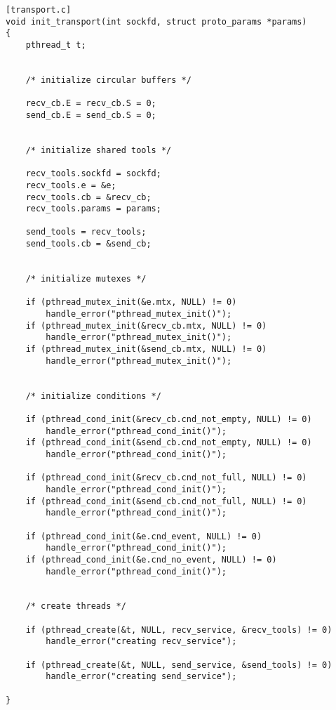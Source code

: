 \begin{lstlisting}[transport.c]
void init_transport(int sockfd, struct proto_params *params)
{
    pthread_t t;


    /* initialize circular buffers */

    recv_cb.E = recv_cb.S = 0;
    send_cb.E = send_cb.S = 0;


    /* initialize shared tools */

    recv_tools.sockfd = sockfd;
    recv_tools.e = &e;
    recv_tools.cb = &recv_cb;
    recv_tools.params = params;

    send_tools = recv_tools;
    send_tools.cb = &send_cb;


    /* initialize mutexes */

    if (pthread_mutex_init(&e.mtx, NULL) != 0)
        handle_error("pthread_mutex_init()");
    if (pthread_mutex_init(&recv_cb.mtx, NULL) != 0)
        handle_error("pthread_mutex_init()");
    if (pthread_mutex_init(&send_cb.mtx, NULL) != 0)
        handle_error("pthread_mutex_init()");


    /* initialize conditions */

    if (pthread_cond_init(&recv_cb.cnd_not_empty, NULL) != 0)
        handle_error("pthread_cond_init()");
    if (pthread_cond_init(&send_cb.cnd_not_empty, NULL) != 0)
        handle_error("pthread_cond_init()");

    if (pthread_cond_init(&recv_cb.cnd_not_full, NULL) != 0)
        handle_error("pthread_cond_init()");
    if (pthread_cond_init(&send_cb.cnd_not_full, NULL) != 0)
        handle_error("pthread_cond_init()");

    if (pthread_cond_init(&e.cnd_event, NULL) != 0)
        handle_error("pthread_cond_init()");
    if (pthread_cond_init(&e.cnd_no_event, NULL) != 0)
        handle_error("pthread_cond_init()");


    /* create threads */

    if (pthread_create(&t, NULL, recv_service, &recv_tools) != 0)
        handle_error("creating recv_service");

    if (pthread_create(&t, NULL, send_service, &send_tools) != 0)
        handle_error("creating send_service");

}
\end{lstlisting}
